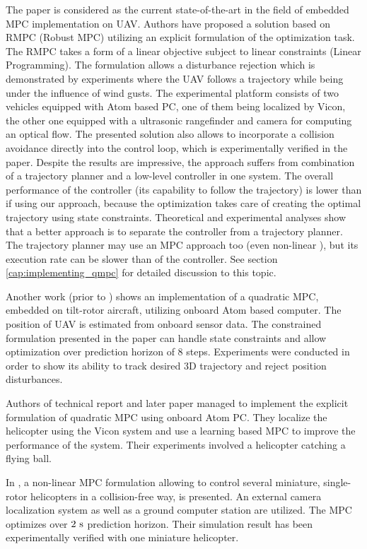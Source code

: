 The paper \citep{alexis2014rmpc} is considered as the current state-of-the-art in the field of embedded MPC implementation on UAV. Authors have proposed a solution based on RMPC (Robust MPC)  utilizing an explicit formulation of the optimization task. The RMPC takes a form of a linear objective subject to linear constraints (Linear Programming). The formulation allows a disturbance rejection which is demonstrated by experiments where the UAV follows a trajectory while being under the influence of wind gusts. The experimental platform consists of two vehicles equipped with Atom based PC, one of them being localized by Vicon, the other one equipped with a ultrasonic rangefinder and camera for computing an optical flow. The presented solution also allows to incorporate a collision avoidance directly into the control loop, which is experimentally verified in the paper. Despite the results are impressive, the approach suffers from combination of a trajectory planner and a low-level controller in one system. The overall performance of the controller (its capability to follow the trajectory) is lower than if using our approach, because the optimization takes care of creating the optimal trajectory using state constraints. Theoretical and experimental analyses show that a better approach is to separate the controller from a trajectory planner. The trajectory planner may use an MPC approach too (even non-linear \citep{saska2014formations}), but its execution rate can be slower than of the controller. See section \ref{cap:implementing_qmpc} for detailed discussion to this topic.

Another work \citep{papachristos2013} (prior to \citep{alexis2014rmpc}) shows an implementation of a quadratic MPC, embedded on tilt-rotor aircraft, utilizing onboard Atom based computer. The position of UAV is estimated from onboard sensor data. The constrained formulation presented in the paper can handle state constraints and allow optimization over prediction horizon of 8 steps. Experiments were conducted in order to show its ability to track desired 3D trajectory and reject position disturbances.

Authors of technical report \citep{bouffard2012dtic} and later paper \citep{bouffard2012learning} managed to implement the explicit formulation of quadratic MPC using onboard Atom PC. They localize the helicopter using the Vicon system and use a learning based MPC to improve the performance of the system. Their experiments involved a helicopter catching a flying ball. 

In \cite{suzuki2014collision}, a non-linear MPC formulation allowing to control several miniature, single-rotor helicopters in a collision-free way, is presented. An external camera localization system as well as a ground computer station are utilized. The MPC optimizes over $2 ~\mathrm{s}$ prediction horizon. Their simulation result has been experimentally verified with one miniature helicopter.

